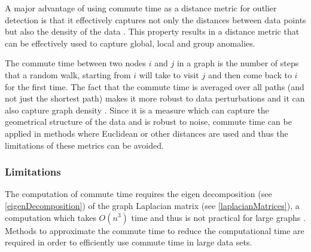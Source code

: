 A major advantage of using commute time as a distance metric for outlier
detection is that it effectively captures not only the distances between data
points but also the density of the data \citeNeeded{}. This property results in
a distance metric that can be effectively used to capture global, local and
group anomalies.

The commute time between two nodes $i$ and $j$ in a graph is the number of steps
that a random walk, starting from $i$ will take to visit $j$ and then come back
to $i$ for the first time. The fact that the commute time is averaged over all
paths (and not just the shortest path) makes it more robust to data
perturbations and it can also capture graph density \cite{Khoa:2012}. Since it
is a measure which can capture the geometrical structure of the data and is
robust to noise, commute time can be applied in methods where Euclidean or other
distances are used and thus the limitations of these metrics can be avoided.

\subsubsection{Limitations}
\label{commuteTime:limitations}
The computation of commute time requires the eigen decomposition (see
\autoref{eigenDecomposition}) of the graph Laplacian matrix (see
\autoref{laplacianMatrices}), a computation which takes $O(n^3)$ time and thus
is not practical for large graphs \citeNeeded{}. Methods to approximate the
commute time to reduce the computational time are required in order to
efficiently use commute time in large data sets.